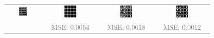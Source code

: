 \documentclass{article} %
\theoremstyle{definition}
\begin{document}
\begin{figure}[htp]
\begin{adjustbox}{max width=0.8\textwidth}
\begin{tabular}{cccc}
    \includegraphics[width=0.25\textwidth]{figures/diri/groundtruth.png} &  \includegraphics[width=0.25\textwidth]{figures/diri/measurements.png} &     \includegraphics[width=0.25\textwidth]{figures/diri/Dreco.png} & \includegraphics[width=0.25\textwidth]{figures/diri/reco.png} \\
    & \textcolor{gray}{MSE: 0.0064} & \textcolor{gray}{MSE: 0.0018}& \textcolor{gray}{MSE: 0.0012}\\

\end{tabular}
\end{adjustbox}
\end{figure}
\end{document}
